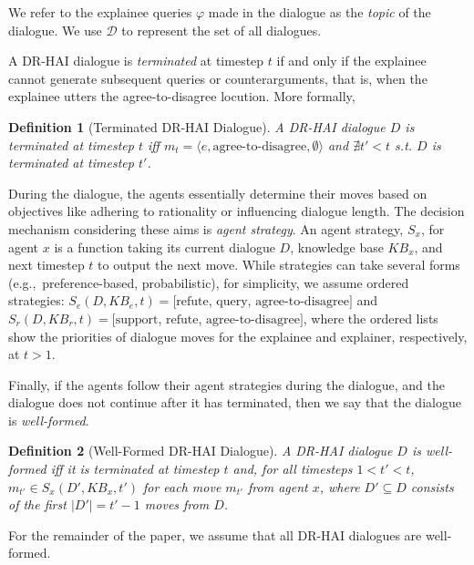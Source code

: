 \documentclass[letterpaper]{article} %
\newtheorem{definition}{{\bf Definition}}
\begin{document}
\noindent We refer to the explainee queries $\varphi$ made in the dialogue as the \emph{topic} of the dialogue. We use $\mathcal{D}$ to represent the set of all dialogues.


A DR-HAI dialogue is \emph{terminated} at timestep $t$ if and only if the explainee cannot generate subsequent queries or counterarguments, that is, when the explainee utters the \mbox{agree}-\mbox{to}-\mbox{disagree} locution. More formally,

\begin{definition}[Terminated DR-HAI Dialogue]
\label{def:term}
    A DR-HAI dialogue $D$ is \emph{terminated} at timestep $t$ iff $m_t = \langle e, \mbox{agree}\text{-}\mbox{to}\text{-}\mbox{disagree}, \emptyset \rangle$ and $\nexists t'<t$ s.t. $D$ is terminated at timestep $t'$.
\end{definition}

During the dialogue, the agents essentially determine their moves based on objectives like adhering to rationality or influencing dialogue length. The decision mechanism considering these aims is \emph{agent strategy}. An agent strategy, $S_x$, for agent $x$ is a function taking its current dialogue $D$, knowledge base $KB_x$, and next timestep $t$ to output the next move. While strategies can take several forms (e.g.,~preference-based, probabilistic), for simplicity, we assume ordered strategies:  $S_e(D, KB_e, t) = [\mbox{refute}$, $\mbox{query}$, $\mbox{agree}\text{-}\mbox{to}\text{-}\mbox{disagree}]$ and $S_r(D, KB_r, t) = [\mbox{support}$, $\mbox{refute}$, $\mbox{agree}\text{-}\mbox{to}\text{-}\mbox{disagree}]$, where the ordered lists show the priorities of dialogue moves for the explainee and explainer, respectively, at $t > 1$.




Finally, if the agents follow their agent strategies during the dialogue, and the dialogue does not continue after it has terminated, then we say that the dialogue is \emph{well-formed}.

\begin{definition}[Well-Formed DR-HAI Dialogue]
A DR-HAI dialogue $D$ is \emph{well-formed} iff it is terminated at timestep $t$ and, for all timesteps $1<t'<t$, $m_{t'}\in S_x(D', KB_x, t')$ for each move $m_{t'}$ from agent $x$, where $D' \subseteq D$ consists of the first $|D'| = t' - 1$ moves from $D$.
\end{definition}

For the remainder of the paper, we assume that all DR-HAI dialogues are well-formed.
\end{document}
